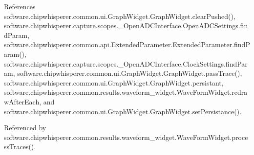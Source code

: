 References software.\+chipwhisperer.\+common.\+ui.\+Graph\+Widget.\+Graph\+Widget.\+clear\+Pushed(), software.\+chipwhisperer.\+capture.\+scopes.\+\_\+\+Open\+A\+D\+C\+Interface.\+Open\+A\+D\+C\+Settings.\+find\+Param, software.\+chipwhisperer.\+common.\+api.\+Extended\+Parameter.\+Extended\+Parameter.\+find\+Param(), software.\+chipwhisperer.\+capture.\+scopes.\+\_\+\+Open\+A\+D\+C\+Interface.\+Clock\+Settings.\+find\+Param, software.\+chipwhisperer.\+common.\+ui.\+Graph\+Widget.\+Graph\+Widget.\+pass\+Trace(), software.\+chipwhisperer.\+common.\+ui.\+Graph\+Widget.\+Graph\+Widget.\+persistant, software.\+chipwhisperer.\+common.\+results.\+waveform\+\_\+widget.\+Wave\+Form\+Widget.\+redraw\+After\+Each, and software.\+chipwhisperer.\+common.\+ui.\+Graph\+Widget.\+Graph\+Widget.\+set\+Persistance().



Referenced by software.\+chipwhisperer.\+common.\+results.\+waveform\+\_\+widget.\+Wave\+Form\+Widget.\+process\+Traces().


